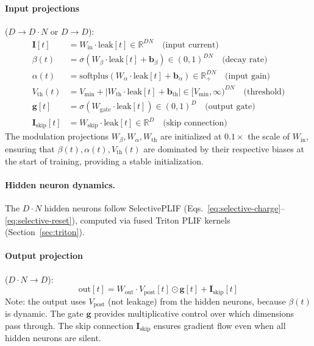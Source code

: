 \documentclass{article}
\newcommand{\vpost}{V_{\text{post}}}
\newcommand{\vth}{V_{\text{th}}}
\newcommand{\vmin}{V_{\text{min}}}
\newcommand{\R}{\mathbb{R}}
\begin{document}
\paragraph{Input projections} ($D \to D \cdot N$ or $D \to D$):
\begin{align}
    \mathbf{I}[t] &= W_{\text{in}} \cdot \text{leak}[t] \in \R^{DN} \quad \text{(input current)} \label{eq:block-I} \\
    \beta(t) &= \sigma(W_\beta \cdot \text{leak}[t] + \mathbf{b}_\beta) \in (0,1)^{DN} \quad \text{(decay rate)} \label{eq:block-beta} \\
    \alpha(t) &= \text{softplus}(W_\alpha \cdot \text{leak}[t] + \mathbf{b}_\alpha) \in \R_+^{DN} \quad \text{(input gain)} \label{eq:block-alpha} \\
    \vth(t) &= \vmin + |W_{\text{th}} \cdot \text{leak}[t] + \mathbf{b}_{\text{th}}| \in [\vmin, \infty)^{DN} \quad \text{(threshold)} \label{eq:block-vth} \\
    \mathbf{g}[t] &= \sigma(W_{\text{gate}} \cdot \text{leak}[t]) \in (0,1)^D \quad \text{(output gate)} \label{eq:block-gate} \\
    \mathbf{I}_{\text{skip}}[t] &= W_{\text{skip}} \cdot \text{leak}[t] \in \R^D \quad \text{(skip connection)} \label{eq:block-skip}
\end{align}
The modulation projections $W_\beta, W_\alpha, W_{\text{th}}$ are initialized at $0.1\times$ the scale of $W_{\text{in}}$, ensuring that $\beta(t), \alpha(t), \vth(t)$ are dominated by their respective biases at the start of training, providing a stable initialization.

\paragraph{Hidden neuron dynamics.}
The $D \cdot N$ hidden neurons follow SelectivePLIF (Eqs.~\ref{eq:selective-charge}--\ref{eq:selective-reset}), computed via fused Triton PLIF kernels (Section~\ref{sec:triton}).

\paragraph{Output projection} ($D \cdot N \to D$):
\begin{equation}
    \text{out}[t] = W_{\text{out}} \cdot \vpost[t] \odot \mathbf{g}[t] + \mathbf{I}_{\text{skip}}[t]
    \label{eq:block-out}
\end{equation}
Note: the output uses $\vpost$ (not leakage) from the hidden neurons, because $\beta(t)$ is dynamic.
The gate $\mathbf{g}$ provides multiplicative control over which dimensions pass through.
The skip connection $\mathbf{I}_{\text{skip}}$ ensures gradient flow even when all hidden neurons are silent.
\end{document}
